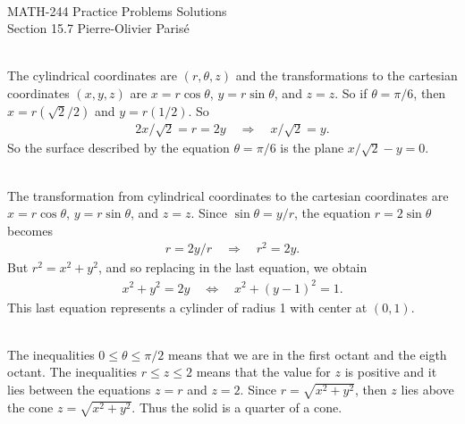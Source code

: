 


	\noindent \hrulefill \\
	MATH-244 \semester \hfill Practice Problems Solutions\\
	Section 15.7 \hfill Pierre-Olivier Paris{\'e} \\\vspace*{-1cm}
	
	\noindent\hrulefill
	
	\spc	

	\\
	The cylindrical coordinates are $(r, \theta , z)$ and the transformations to the cartesian coordinates $(x, y, z)$ are $x = r \cos \theta$, $y = r \sin \theta$, and $z = z$. So if $\theta = \pi/6$, then $x = r (\sqrt{2}/{2})$ and $y = r (1/2)$. So
		\begin{align*}
		2x/\sqrt{2} = r = 2y \quad \Rightarrow \quad x/\sqrt{2} = y .
		\end{align*}
	So the surface described by the equation $\theta = \pi/6$ is the plane $x/\sqrt{2} - y = 0$.
	
	\spc
	
	\\
	The transformation from cylindrical coordinates to the cartesian coordinates are $x = r \cos \theta$, $y = r \sin \theta$, and $z = z$. Since $\sin \theta = y/r$, the equation $r = 2 \sin \theta$ becomes
		\begin{align*}
		r = 2y/r \quad \Rightarrow \quad r^2 = 2y .
		\end{align*}
	But $r^2 = x^2 + y^2$, and so replacing in the last equation, we obtain
		\begin{align*}
		x^2 + y^2 = 2y \quad \iff \quad x^2 + (y - 1)^2 = 1 .
		\end{align*}
	This last equation represents a cylinder of radius 1 with center at $(0, 1)$.
	
	\spc
	
	\\
	The inequalities $0 \leq \theta \leq \pi/2$ means that we are in the first octant and the eigth octant. The inequalities $r \leq z \leq 2$ means that the value for $z$ is positive and it lies between the equations $z = r$ and $z = 2$. Since $r = \sqrt{x^2 + y^2}$, then $z$ lies above the cone $z = \sqrt{x^2 + y^2}$. Thus the solid is a quarter of a cone.
	
	\spc
	
